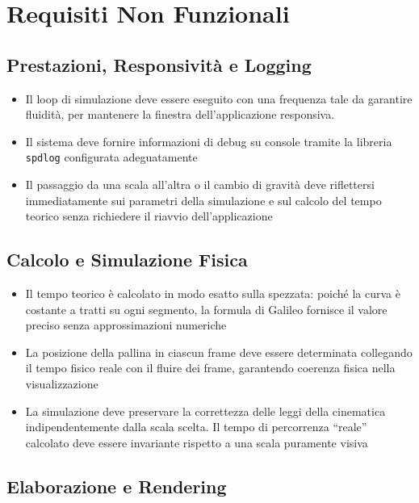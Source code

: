 \documentclass[a4paper,12pt]{article} %
\begin{document}
\section{Requisiti Non Funzionali}

\subsection{Prestazioni, Responsività e Logging}

\begin{itemize}
    \item Il loop di simulazione deve essere eseguito con una frequenza tale da garantire fluidità, per mantenere la finestra dell'applicazione responsiva.
    \item Il sistema deve fornire informazioni di debug su console tramite la libreria \texttt{spdlog} configurata adeguatamente
    \item Il passaggio da una scala all'altra o il cambio di gravità deve riflettersi immediatamente sui parametri della simulazione e sul calcolo del tempo teorico senza richiedere il riavvio dell'applicazione
\end{itemize}

\subsection{Calcolo e Simulazione Fisica}

\begin{itemize}
    \item Il tempo teorico è calcolato in modo esatto sulla spezzata: poiché la curva è costante a tratti su ogni segmento, la formula di Galileo fornisce il valore preciso senza approssimazioni numeriche
    \item La posizione della pallina in ciascun frame deve essere determinata collegando il tempo fisico reale con il fluire dei frame, garantendo coerenza fisica nella visualizzazione
    \item La simulazione deve preservare la correttezza delle leggi della cinematica indipendentemente dalla scala scelta. Il tempo di percorrenza ``reale'' calcolato deve essere invariante rispetto a una scala puramente visiva
\end{itemize}

\subsection{Elaborazione e Rendering}
\end{document}
